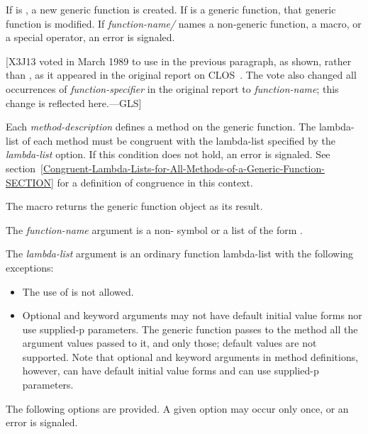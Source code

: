 \begin{defmac}
If  is , a new
generic function is created.  If  is a generic function, that generic function
is modified.  If \emph{function-name/} names a non-generic
function, a macro, or a special operator, an error is signaled.

[X3J13 voted in March 1989  to use 
in the previous paragraph, as shown, rather than ,
as it appeared in the original report on CLOS~\cite{SIGPLAN-CLOS,LASC-CLOS-PART-2}.
The vote also changed all occurrences of \emph{function-specifier} in the
original report to \emph{function-name}; this change is reflected here.---GLS]

Each \emph{method-description\/} defines a method on the generic function.
The lambda-list of each method must be congruent with the lambda-list
specified by the \emph{lambda-list\/} option.  If this condition
does not hold, an error is signaled.
See section~\ref{Congruent-Lambda-Lists-for-All-Methods-of-a-Generic-Function-SECTION}
for a definition
of congruence in this context.

The macro  returns the generic function object 
as its result.




The \emph{function-name} argument is a non- symbol or a
list of the form .


The \emph{lambda-list\/} argument is an ordinary function lambda-list
with the following exceptions:

\begin{itemize}
\item 
The use of  is not allowed. 

\item 
Optional and keyword arguments may not have default initial value forms
nor use supplied-p parameters.
The generic function passes to the method all the argument values passed to
it, and only those; default values are not supported.
Note that optional and keyword arguments in method definitions, however,
can have default initial value forms and can use supplied-p parameters. 
\end{itemize}

The following options are provided.  A given option may occur only once,
or an error is signaled.

\begin{itemize}
 

\end{itemize}
\end{defmac}
